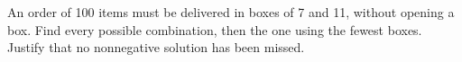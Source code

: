 \documentclass[11pt]{article}
\begin{document}
An order of 100 items must be delivered in boxes of 7 and 11, without opening a box. Find every possible combination, then the one using the fewest boxes. Justify that no nonnegative solution has been missed.\par
\vspace{5pt}
\end{document}
